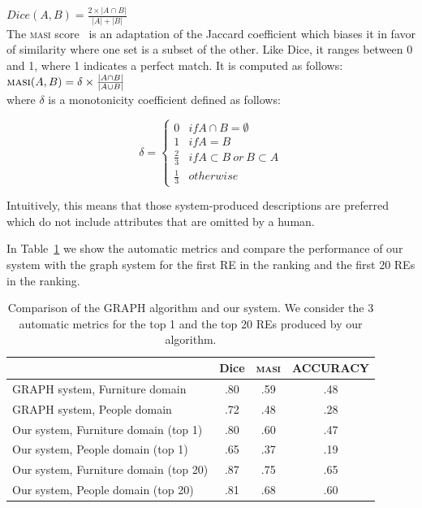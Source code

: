 $Dice(A,B) = \frac{2\times|A \cap B|}{|A|+|B|}$\\


The \textsc{masi} score \cite{Passonneau06measuringagreement}~is an adaptation of the Jaccard coefficient
which biases it in favor of similarity where one set
is a subset of the other. Like Dice, it ranges between
0 and 1, where 1 indicates a perfect match. It is computed as follows:\\


$\textsc{masi}(A,B) = \delta \times \frac{|A \cap B|}{|A \cup B|}$ \\


where $\delta$ is a monotonicity coefficient defined as follows:


 \begin{equation}
     \delta  = \left\{
	       \begin{array}{ll}
		 0      & if A \cap B = \emptyset \\
		 1 & if A = B  \\
		 \frac{2}{3}     & if A \subset B ~or~ B \subset A\\
		 \frac{1}{3}     & otherwise
	       \end{array}
	     \right.
 \end{equation}


Intuitively, this
means that those system-produced descriptions are
preferred which do not include attributes that are
omitted by a human.  

In Table~\ref{Tabla_sis_1_20} we show the automatic metrics and compare the performance of our system  with the graph system for the first RE in the ranking and the first 20 REs in the ranking. 

\begin{table}[h!]
\begin{center}
\begin{tabular}{|l|c|c|c|}
\hline
	 	& 	Dice		&	\textsc{masi}	&	ACCURACY		\\
\hline
GRAPH system, Furniture domain	& 	.80 		&	.59	&	.48		 	\\
GRAPH system, People domain 	& 	.72		&	.48	&	.28			\\
\hline
Our system, Furniture domain (top 1)	&	.80		&	.60	&	.47		\\
Our system, People domain (top 1)	&	.65		&	.37	&	.19		\\
\hline
Our system, Furniture domain (top 20)&	.87		&	.75  	&	.65		\\
Our system, People domain (top 20)   &	.81		&	.68	&	.60		\\
\hline
\end{tabular}
\caption{Comparison of the GRAPH algorithm and our system. We consider the 3 automatic metrics for the top 1 and the top 20 REs produced by our algorithm.}
\vspace*{-.5cm}
\label{Tabla_sis_1_20}
\end{center}
\end{table}


